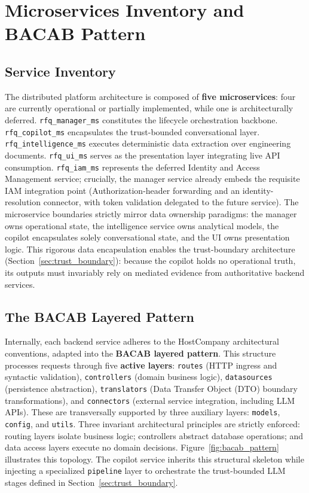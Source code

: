 \section{Microservices Inventory and BACAB Pattern}\label{sec:bacab_pattern}
\subsection{Service Inventory}
The distributed platform architecture is composed of \textbf{five microservices}: four are currently operational or partially implemented, while one is architecturally deferred. \texttt{rfq\_manager\_ms} constitutes the lifecycle orchestration backbone. \texttt{rfq\_copilot\_ms} encapsulates the trust-bounded conversational layer. \texttt{rfq\_intelligence\_ms} executes deterministic data extraction over engineering documents. \texttt{rfq\_ui\_ms} serves as the presentation layer integrating live API consumption. \texttt{rfq\_iam\_ms} represents the deferred Identity and Access Management service; crucially, the manager service already embeds the requisite IAM integration point (Authorization-header forwarding and an identity-resolution connector, with token validation delegated to the future service). The microservice boundaries strictly mirror data ownership paradigms: the manager owns operational state, the intelligence service owns analytical models, the copilot encapsulates solely conversational state, and the UI owns presentation logic. This rigorous data encapsulation enables the trust-boundary architecture (Section~\ref{sec:trust_boundary}): because the copilot holds no operational truth, its outputs must invariably rely on mediated evidence from authoritative backend services.

\subsection{The BACAB Layered Pattern}
Internally, each backend service adheres to the HostCompany architectural conventions, adapted into the \textbf{BACAB layered pattern}. This structure processes requests through five \textbf{active layers}: \texttt{routes} (HTTP ingress and syntactic validation), \texttt{controllers} (domain business logic), \texttt{datasources} (persistence abstraction), \texttt{translators} (Data Transfer Object (DTO) boundary transformations), and \texttt{connectors} (external service integration, including LLM APIs). These are transversally supported by three auxiliary layers: \texttt{models}, \texttt{config}, and \texttt{utils}. Three invariant architectural principles are strictly enforced: routing layers isolate business logic; controllers abstract database operations; and data access layers execute no domain decisions. Figure~\ref{fig:bacab_pattern} illustrates this topology. The copilot service inherits this structural skeleton while injecting a specialized \texttt{pipeline} layer to orchestrate the trust-bounded LLM stages defined in Section~\ref{sec:trust_boundary}.

